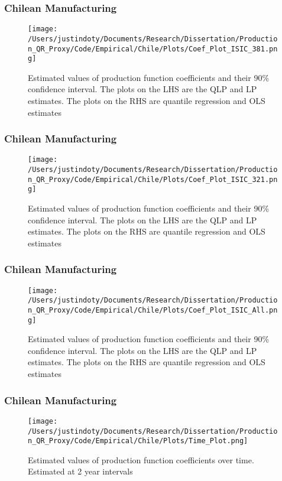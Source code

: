 \documentclass{beamer}
\begin{document}
\begin{frame}
\frametitle{Chilean Manufacturing}
\begin{figure}[ht]
\centering
\texttt{[image: /Users/justindoty/Documents/Research/Dissertation/Production\_QR\_Proxy/Code/Empirical/Chile/Plots/Coef\_Plot\_ISIC\_381.png]}
\caption{Estimated values of production function coefficients and their 90\% confidence interval. The plots on the LHS are the QLP and LP estimates. The plots on the RHS are quantile regression and OLS estimates}
\end{figure}
\end{frame}

\begin{frame}
\frametitle{Chilean Manufacturing}
\begin{figure}[ht]
\centering
\texttt{[image: /Users/justindoty/Documents/Research/Dissertation/Production\_QR\_Proxy/Code/Empirical/Chile/Plots/Coef\_Plot\_ISIC\_321.png]}
\caption{Estimated values of production function coefficients and their 90\% confidence interval. The plots on the LHS are the QLP and LP estimates. The plots on the RHS are quantile regression and OLS estimates}
\end{figure}
\end{frame}

\begin{frame}
\frametitle{Chilean Manufacturing}
\begin{figure}[ht]
\centering
\texttt{[image: /Users/justindoty/Documents/Research/Dissertation/Production\_QR\_Proxy/Code/Empirical/Chile/Plots/Coef\_Plot\_ISIC\_All.png]}
\caption{Estimated values of production function coefficients and their 90\% confidence interval. The plots on the LHS are the QLP and LP estimates. The plots on the RHS are quantile regression and OLS estimates}
\end{figure}
\end{frame}

\begin{frame}
\frametitle{Chilean Manufacturing}
\begin{figure}[ht]
\centering
\texttt{[image: /Users/justindoty/Documents/Research/Dissertation/Production\_QR\_Proxy/Code/Empirical/Chile/Plots/Time\_Plot.png]}
\caption{Estimated values of production function coefficients over time. Estimated at 2 year intervals}
\end{figure}
\end{frame}
\end{document}
